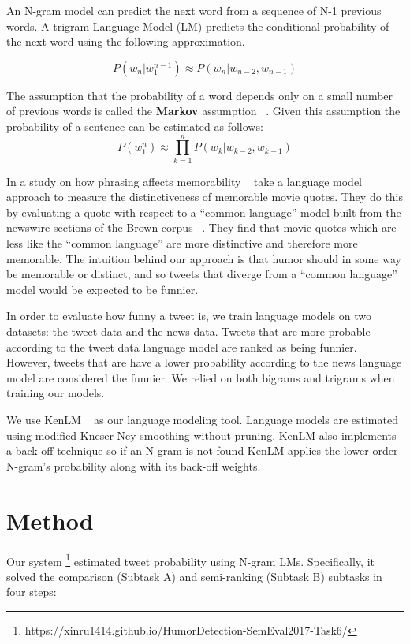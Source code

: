 \documentclass[11pt,a4paper]{article}
\begin{document}
An N-gram model can predict the next word from a sequence of N-1 previous words.
A trigram Language Model (LM) predicts the conditional probability of the next word using the following approximation.

\begin{equation}
P(w_n|w_1^{n-1})\approx P(w_n|w_{n-2}, w_{n-1})
\end{equation}

The assumption that the probability of a word depends only on a small number of previous words 
is called the \textbf{Markov} assumption ~\cite{markov1954theory}. Given this assumption 
the probability of a sentence can be estimated as follows:
\begin{equation}
P(w_1^n)\approx \prod_{k=1}^{n} P(w_k|w_{k-2}, w_{k-1})
\end{equation}
 
In a study on how phrasing affects memorability ~\cite{hello} take a language model approach to measure the distinctiveness of
memorable movie quotes. They do this by evaluating a quote with respect to a ``common language'' model built from the newswire sections 
of the Brown corpus ~\cite{BC}. They find that movie quotes which are less like the ``common language'' are more distinctive and therefore
more memorable. The intuition behind our approach is that humor should in some way be memorable or distinct, and so tweets that 
diverge from a ``common language'' model would be expected to be funnier. 

In order to evaluate how funny a tweet is, we train language models on two datasets: the tweet data and the news data. 
Tweets that are more probable according to the tweet data language model are ranked as being funnier. However, tweets
that are have a lower probability according to the news language model are considered the funnier. We relied on both
bigrams and trigrams when training our models. 

We use KenLM ~\cite{Heafield-estimate} as our language modeling tool. Language models are estimated using modified Kneser-Ney smoothing 
without pruning. KenLM also implements a back-off technique so if an N-gram is not found KenLM applies the lower order N-gram's probability 
along with its back-off weights. 

\section{Method}

Our system \footnote{https://xinru1414.github.io/HumorDetection-SemEval2017-Task6/} estimated tweet probability using N-gram LMs. 
Specifically, it solved the comparison (Subtask A) and semi-ranking (Subtask B) subtasks in four steps:
\end{document}
